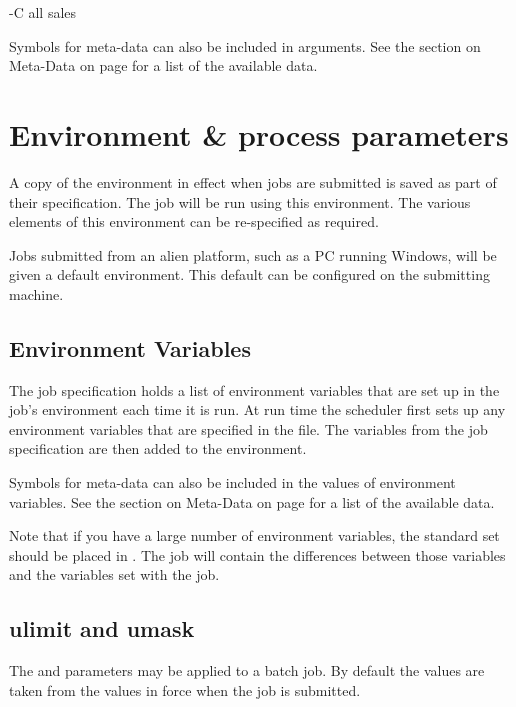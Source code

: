 \begin{expara}

{}-C\newline
all\newline
sales

\end{expara}

Symbols for meta-data can also be included in arguments. See the section
on Meta-Data on page \pageref{bkm:Metadata} for a list of the available data.

\section{Environment \& process parameters}
A copy of the environment in effect when jobs are submitted is saved as part of their specification. The job will be run using this
environment. The various elements of this environment can be re-specified as required.

Jobs submitted from an alien platform, such as a PC running Windows, will be given a default environment. This default can be configured on
the submitting machine.

\subsection{Environment Variables}
The job specification holds a list of environment variables that are set up in the job's environment each time it is run. At
run time the scheduler first sets up any environment variables that are specified in the \batchenv{} file. The
variables from the job specification are then added to the environment.

Symbols for meta-data can also be included in the values of environment variables. See the section on Meta-Data on page \pageref{bkm:Metadata} for a list of the available data.

Note that if you have a large number of environment variables, the standard set should be placed in \batchenv{}.
The job will contain the differences between those variables and the variables set with the job.

\subsection{ulimit and umask}
The  and  parameters may be applied to a batch job. By default the values are
taken from the values in force when the job is submitted.

